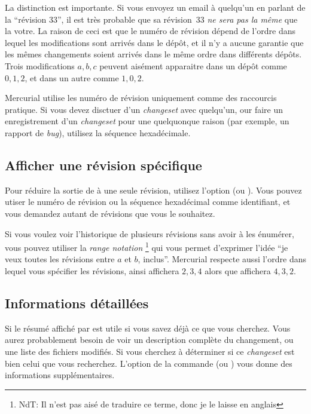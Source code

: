 La distinction est importante. Si vous envoyez un email à quelqu'un en
parlant de la ``révision 33'', il est très probable que sa révision~33
\emph{ne sera pas la même} que la votre. La raison de ceci est que le
numéro de révision dépend de l'ordre dans lequel les modifications sont
arrivés dans le dépôt, et il n'y a aucune garantie que les mêmes changements
soient arrivés dans le même ordre dans différents dépôts. Trois modifications
$a,b,c$ peuvent aisément apparaitre dans un dépôt comme $0,1,2$, et dans
un autre comme $1,0,2$.

Mercurial utilise les numéro de révision uniquement comme des raccourcis
pratique. Si vous devez disctuer d'un \textit{changeset} avec quelqu'un, 
our faire un enregistrement d'un \textit{changeset} pour une quelquonque
raison (par exemple, un rapport de \textit{bug}), utilisez la séquence
hexadécimale.

\subsection{Afficher une révision spécifique}

Pour réduire la sortie de  à une seule révision, utilisez
l'option  (ou ). Vous pouvez utiser
le numéro de révision ou la séquence hexadécimal comme identifiant, et 
vous demandez autant de révisions que vous le souhaitez. 

Si vous voulez voir l'historique de plusieurs révisions sans avoir à 
les énumérer, vous pouvez utiliser la \emph{\textit{range notation}}
\footnote{NdT: Il n'est pas aisé de traduire ce terme, donc je le 
laisse en anglais} qui vous permet d'exprimer l'idée ``je veux toutes
les révisions entre $a$ et $b$, inclus''.
Mercurial respecte aussi l'ordre dans lequel vous spécifier les 
révisions, ainsi  affichera $2,3,4$ alors que 
 affichera $4,3,2$.

\subsection{Informations détaillées}

Si le résumé affiché par  est utile si vous savez déjà ce                                                                   
que vous cherchez. Vous aurez probablement besoin de voir un description                                                               
complète du changement, ou une liste des fichiers modifiés. Si vous                                                                    
cherchez à déterminer si ce \textit{changeset} est bien celui que vous                                                                 
recherchez. L'option  de la commande  (ou                                                                         
) vous donne des informations supplémentaires.

